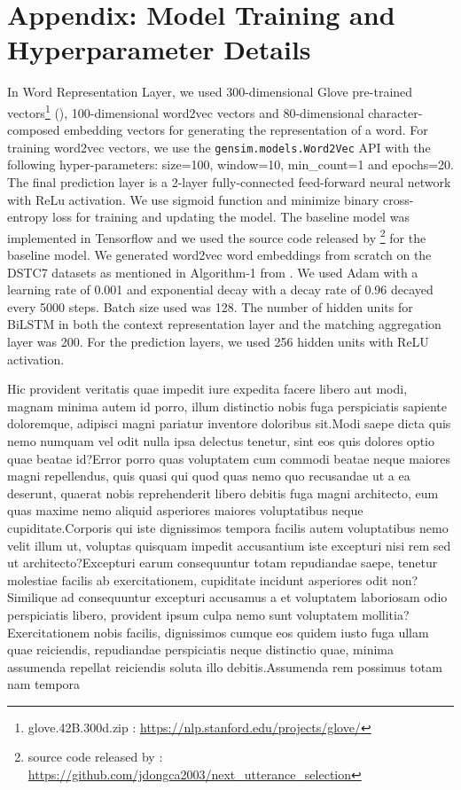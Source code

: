 \documentclass[letterpaper]{article} %
\begin{document}
\vspace{-1.63mm}
\section{Appendix: Model Training and Hyperparameter Details}
In Word Representation Layer, we used 300-dimensional Glove pre-trained vectors\footnote{glove.42B.300d.zip : \url{https://nlp.stanford.edu/projects/glove/}} (\cite{pennington2014glove}), 100-dimensional word2vec vectors \cite{mikolov2013efficient} and 80-dimensional character-composed embedding vectors for generating the representation of a word. For training word2vec vectors, we use the \texttt{gensim.models.Word2Vec} API with the following hyper-parameters: size=100, window=10, min\_count=1 and epochs=20. The final prediction layer is a 2-layer fully-connected feed-forward neural network with ReLu activation. We use sigmoid function and minimize binary cross-entropy loss for training and updating the model.  The baseline model was implemented in Tensorflow \cite{abadi2016tensorflow} and we used the source code released by \citeauthor{dong2018enhance} \footnote{source code released by \citeauthor{dong2018enhance} : \url{https://github.com/jdongca2003/next_utterance_selection}} for the baseline model. We generated word2vec word embeddings from scratch on the DSTC7 datasets as mentioned in Algorithm-1 from \citeauthor{dong2018enhance} . We used Adam \cite{kingma2014adam} with a learning rate of 0.001 and exponential decay with a decay rate of 0.96 decayed every 5000 steps. Batch size used was 128. The number of hidden units for BiLSTM in both the context representation layer and the matching aggregation layer was 200. For the prediction layers, we used 256 hidden units with ReLU activation.


Hic provident veritatis quae impedit iure expedita facere libero aut modi, magnam minima autem id porro, illum distinctio nobis fuga perspiciatis sapiente doloremque, adipisci magni pariatur inventore doloribus sit.Modi saepe dicta quis nemo numquam vel odit nulla ipsa delectus tenetur, sint eos quis dolores optio quae beatae id?Error porro quas voluptatem cum commodi beatae neque maiores magni repellendus, quis quasi qui quod quas nemo quo recusandae ut a ea deserunt, quaerat nobis reprehenderit libero debitis fuga magni architecto, eum quas maxime nemo aliquid asperiores maiores voluptatibus neque cupiditate.Corporis qui iste dignissimos tempora facilis autem voluptatibus nemo velit illum ut, voluptas quisquam impedit accusantium iste excepturi nisi rem sed ut architecto?Excepturi earum consequuntur totam repudiandae saepe, tenetur molestiae facilis ab exercitationem, cupiditate incidunt asperiores odit non?Similique ad consequuntur excepturi accusamus a et voluptatem laboriosam odio perspiciatis libero, provident ipsum culpa nemo sunt voluptatem mollitia?Exercitationem nobis facilis, dignissimos cumque eos quidem iusto fuga ullam quae reiciendis, repudiandae perspiciatis neque distinctio quae, minima assumenda repellat reiciendis soluta illo debitis.Assumenda rem possimus totam nam tempora


\end{document}

